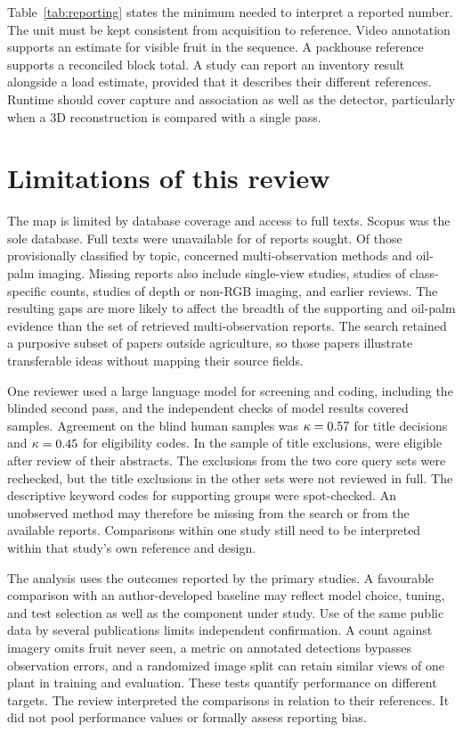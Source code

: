 Table~\ref{tab:reporting} states the minimum needed to interpret a reported number. The unit must be kept consistent from acquisition to reference. Video annotation supports an estimate for visible fruit in the sequence. A packhouse reference supports a reconciled block total. A study can report an inventory result alongside a load estimate, provided that it describes their different references. Runtime should cover capture and association as well as the detector, particularly when a 3D reconstruction is compared with a single pass.

\section{Limitations of this review}\label{sec:limits}

The map is limited by database coverage and access to full texts. Scopus was the sole database. Full texts were unavailable for \nNotRetrieved of \nSought reports sought. Of those provisionally classified by topic, \nNotRetrievedMulti concerned multi-observation methods and \nNotRetrievedPalm oil-palm imaging. Missing reports also include \nNotRetrievedSingle single-view studies, \nNotRetrievedClass studies of class-specific counts, \nNotRetrievedDepth studies of depth or non-RGB imaging, and \nNotRetrievedReview earlier reviews. The resulting gaps are more likely to affect the breadth of the supporting and oil-palm evidence than the set of retrieved multi-observation reports. The search retained a purposive subset of papers outside agriculture, so those papers illustrate transferable ideas without mapping their source fields.

One reviewer used a large language model for screening and coding, including the blinded second pass, and the independent checks of model results covered samples. Agreement on the blind human samples was \(\kappa=0.57\) for title decisions and \(\kappa=0.45\) for eligibility codes. In the sample of \nSampleTitles title exclusions, \nSampleTitlesEligible were eligible after review of their abstracts. The exclusions from the two core query sets were rechecked, but the title exclusions in the other sets were not reviewed in full. The descriptive keyword codes for supporting groups were spot-checked. An unobserved method may therefore be missing from the search or from the available reports. Comparisons within one study still need to be interpreted within that study's own reference and design.

The analysis uses the outcomes reported by the primary studies. A favourable comparison with an author-developed baseline may reflect model choice, tuning, and test selection as well as the component under study. Use of the same public data by several publications limits independent confirmation. A count against imagery omits fruit never seen, a metric on annotated detections bypasses observation errors, and a randomized image split can retain similar views of one plant in training and evaluation. These tests quantify performance on different targets. The review interpreted the comparisons in relation to their references. It did not pool performance values or formally assess reporting bias.

